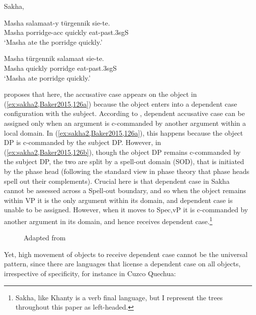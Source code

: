 \documentclass[output=paper
,modfonts
,nonflat]{langsci/langscibook}
\begin{document}
\begin{exe}
\ex Sakha, \citet[][126]{Baker2015} \label{ex:sakha2,Baker2015,1262}
\begin{xlist}
\ex
\gll Masha salamaat-y t\"{u}rgennik sie-te.\\
Masha porridge-{\sc acc} quickly eat-{\sc past.3sgS}\\
\glt `Masha ate the porridge quickly.' \label{ex:sakha2,Baker2015,126a}

\ex
\gll Masha t\"{u}rgennik salamaat sie-te.\\
Masha quickly porridge eat-{\sc past.3sgS}\\
\glt `Masha ate porridge quickly.'\label{ex:sakha2,Baker2015,126b}
\end{xlist}
\end{exe}


\noindent \citeauthor{Baker2015} proposes that here, the accusative case appears on the object in (\ref{ex:sakha2,Baker2015,126a}) because the object enters into a dependent case configuration with the subject. 
According to \citeauthor{Baker2015}, dependent accusative case can be assigned only when an argument is c-commanded by another argument within a local domain. 
In (\ref{ex:sakha2,Baker2015,126a}), this happens because the object DP is c-commanded by the subject DP. 
However, in (\ref{ex:sakha2,Baker2015,126b}), though the object DP remains c-commanded by the subject DP, the two are split by a spell-out domain (SOD), that is initiated by the phase head (following the standard view in phase theory that phase heads spell out their complements). 
Crucial here is that dependent case in Sakha cannot be assessed across a Spell-out boundary, and so when the object remains within VP it is the only argument within its domain, and dependent case is unable to be assigned. However, when it moves to Spec,vP it is c-commanded by another argument in its domain, and hence receives dependent case.\footnote{Sakha, like Khanty is a verb final language, but I represent the trees throughout this paper as left-headed.}

\begin{figure}[!h]
\begin{exe}
\ex Adapted from \citet[][126]{Baker2015}\\
\end{exe} \vspace{-0.9cm}
\end{figure}
\newpage\noindent Yet, high movement of objects to receive dependent case cannot be the universal pattern, since there are languages that license a dependent case on all objects, irrespective of specificity, for instance in Cuzco Quechua:
\end{document}
